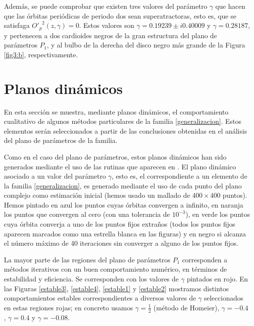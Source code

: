 Además, se puede comprobar que existen tres valores del parámetro $\gamma$ que hacen que las órbitas periódicas de periodo dos sean superatractoras, esto es, que se satisfaga ${O'_{p}}^2(z,\gamma)=0$. Estos valores son $\gamma= 0.19239 \pm
i0.40009$ y $\gamma=0.28187$, y pertenecen a dos cardioides negros de la gran estructura del plano de parámetros $P_1$, y al bulbo de la derecha del disco negro más grande de la Figura \ref{fig3:b}, respectivamente.

\section{Planos dinámicos}

En esta sección se muestra, mediante planos dinámicos, el comportamiento cualitativo de algunos métodos particulares de la familia \eqref{generalizacion}. Estos elementos serán seleccionados a partir de las conclusiones obtenidas en el análisis del plano de parámetros de la familia. 

Como en el caso del plano de parámetros, estos planos dinámicos han sido generados mediante el uso de las rutinas que aparecen en \cite{CCT}. El plano dinámico asociado a un valor del parámetro $\gamma$, esto es, el correspondiente a un elemento de la familia \eqref{generalizacion}, es generado mediante el uso de cada punto del plano complejo como estimación inicial (hemos usado un mallado de $400\times 400$ puntos). Hemos pintado en azul los puntos cuyas órbitas convergen a infinito, en naranja los puntos que convergen al cero (con una tolerancia de $10^{-3}$), en verde los puntos cuya órbita converja a uno de los puntos fijos extraños (todos los puntos fijos aparecen marcados como una estrella blanca en las figuras) y en negro si alcanza el número máximo de 40 iteraciones sin converger a alguno de los puntos fijos.  

La mayor parte de las regiones del plano de parámetros $P_1$ corresponden a métodos iterativos con un buen comportamiento numérico, en términos de estabilidad y eficiencia. Se corresponden con los valores de $\gamma$ pintados en rojo. En las Figuras \ref{estable3}, \ref{estable4}, \ref{estable1} y \ref{estable2} mostramos distintos comportamientos estables correspondientes a diversos valores de $\gamma$ seleccionados en estas regiones rojas; en concreto usamos $\gamma=\frac{1}{2}$ (método de Homeier), $\gamma=-0.4$, $\gamma=0.4$ y $\gamma=-0.08$.

